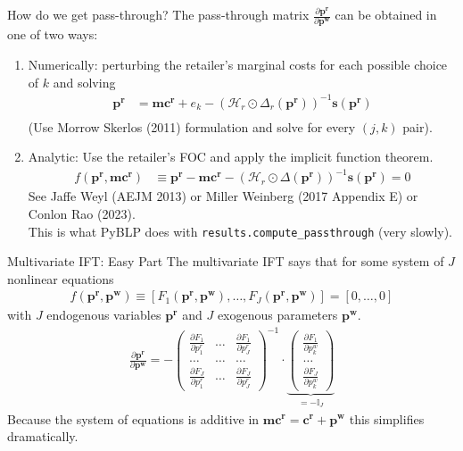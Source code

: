 \begin{frame}{How do we get pass-through?}
The \alert{pass-through matrix} $\frac{\partial \mathbf{p^r}}{\partial \mathbf{p^w}}$ can be obtained in one of two ways:
\begin{enumerate}
\item Numerically: perturbing the retailer's marginal costs for each possible choice of $k$ and solving
\begin{align*}
\mathbf{p^r} &=\mathbf{mc^r} + e_k -(\mathcal{H}_r \odot \Delta_{r}(\mathbf{p^r}))^{-1} \mathbf{s}(\mathbf{p^r})\\
\end{align*}
(Use Morrow Skerlos (2011) formulation and solve for every $(j,k)$ pair).
\item Analytic: Use the retailer's FOC and apply the implicit function theorem.
\begin{align}
\tag{retailer FOC}
 f(\mathbf{p^r},\mathbf{mc^r}) &\equiv \mathbf{p^r}  - \mathbf{mc^r}-  \left(\mathcal{H}_{r} \odot \Delta(\mathbf{p^r}) \right)^{-1} \mathbf{s}(\mathbf{p^r})=0 
\end{align}
See Jaffe Weyl (AEJM 2013) or Miller Weinberg (2017 Appendix E) or Conlon Rao (2023).\\
\alert{This is what PyBLP does} with \texttt{results.compute\_passthrough} (very slowly).
\end{enumerate}
\end{frame}



\begin{frame}{Multivariate IFT: Easy Part}
The multivariate IFT says that for some system of $J$ nonlinear equations 
\begin{align*}
f(\mathbf{p^r},\mathbf{p^w}) \equiv [F_1(\mathbf{p^r},\mathbf{p^w}), \ldots, F_J(\mathbf{p^r},\mathbf{p^w})]=[0,\ldots,0]
\end{align*}
with $J$ endogenous variables $\mathbf{p^r}$ and $J$ exogenous parameters $\mathbf{p^w}$.
\begin{align}
\label{eq:ptr_matrix}
\tag{PTR}
\frac{\partial \mathbf{p^r}}{\partial \mathbf{p^w}}
=-\left(\begin{array}{ccc}
\frac{\partial F_{1}}{\partial p_{1}^r} & \ldots & \frac{\partial F_{1}}{\partial p_{J}^r} \\
\ldots & \ldots & \ldots \\
\frac{\partial F_{J}}{\partial p_{1}^r} & \ldots & \frac{\partial F_{J}}{\partial p_{J}^r}
\end{array}\right)^{-1} \cdot \underbrace{\left(\begin{array}{l}
\frac{\partial F_{1}}{\partial p_{k}^w} \\
\ldots \\
\frac{\partial F_{J}}{\partial p_{k}^w}
\end{array}\right)}_{= -\mathbb{I}_J}
\end{align}
Because the system of equations is additive in $\mathbf{mc^r} = \mathbf{c^r} + \mathbf{p^w}$ this simplifies dramatically.
\end{frame}


